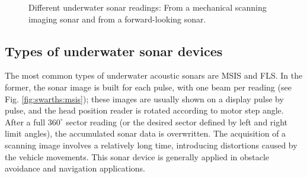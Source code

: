 \documentclass[final,5p,times]{elsarticle}
\begin{document}
\begin{figure}[t]
    \centering
    \captionsetup{justification=centering}
    \caption{Different underwater sonar readings:  From a mechanical scanning imaging sonar and  from a forward-looking sonar.}
    \label{fig:sonar_devices}
\end{figure}

\subsection{Types of underwater sonar devices}
\label{sonar:devices}

The most common types of underwater acoustic sonars are MSIS and FLS. In the former, the sonar image is built for each pulse, with one beam per reading (see Fig. \ref{fig:swarths:msis}); these images are usually shown on a display pulse by pulse, and the head position reader is rotated according to motor step angle. After a full $360^{\circ}$ sector reading (or the desired sector defined by left and right limit angles), the accumulated sonar data is overwritten. The acquisition of a scanning image involves a relatively long time, introducing distortions caused by the vehicle movements. This sonar device is generally applied in obstacle avoidance \cite{ganesan2015} and navigation \cite{ribas2010} applications.
\end{document}
